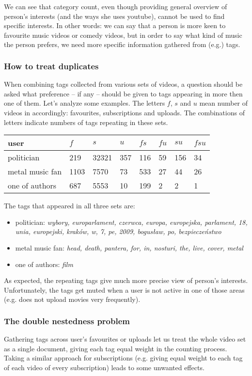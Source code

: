 \documentclass{article}
\begin{document}
We can see that category count, even though providing general overview of
person's interests (and the ways she uses youtube), cannot be used to find
specific interests. In other words: we can say that a person is more keen to
favourite music videos or comedy videos, but in order to say what kind of music
the person prefers, we need more specific information gathered from (e.g.) tags.

\subsubsection{How to treat duplicates}

When combining tags collected from various sets of videos, a question should be
asked what preference -- if any -- should be given to tags appearing in more
then one of them. Let's analyze some examples. The letters $f$, $s$ and $u$ mean number
of videos in accordingly: favourites, subscriptions and uploads. The
combinations of letters indicate numbers of tags repeating in these sets.

\begin{tabular}{| l | l | l | l | l | l | l | l |}
user & $f$ & $s$ & $u$ & $fs$ & $fu$ & $su$ & $fsu$ \\ \hline
politician & 219 & 32321 & 357 & 116 & 59 & 156 & 34 \\
metal music fan & 1103 & 7570 & 73 & 533 & 27 & 44 & 26 \\
one of authors & 687 & 5553 & 10 & 199 & 2 & 2 & 1 \\
\end{tabular}

The tags that appeared in all three sets are:
\begin{itemize}
  \item{politician: \emph{wybory, europarlament, czerwca, europa, europejska,
  parlament, 18, unia, europejski, kraków, w, 7, pe, 2009, bogusław, po,
  bezpieczeństwo}}
  \item{metal music fan: \emph{head, death, pantera, for, in, nosturi, the, live, cover, metal}}
  \item{one of authors: \emph{film}}
\end{itemize}

As expected, the repeating tags give much more precise view of person's
interests. Unfortunately, the tags get muted when a user is not active in one of
those areas (e.g. does not upload movies very frequently).

\subsubsection{The double nestedness problem}
Gathering tags across user's favourites or uploads let us treat the whole video
set as a single document, giving each tag equal weight in the counting process.
Taking a similar approach for subscriptions (e.g. giving equal weight to each
tag of each video of every subscription) leads to some unwanted effects.
\end{document}
